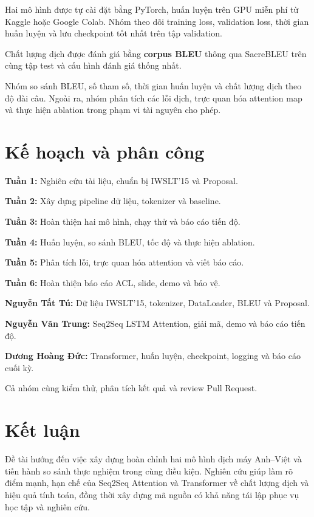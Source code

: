 \documentclass[11pt,a4paper]{article}
\begin{document}
Hai mô hình được tự cài đặt bằng PyTorch,
huấn luyện trên GPU miễn phí từ Kaggle
hoặc Google Colab. Nhóm theo dõi
training loss, validation loss, thời gian
huấn luyện và lưu checkpoint tốt nhất
trên tập validation.

Chất lượng dịch được đánh giá bằng
\textbf{corpus BLEU}
\citep{papineni2002bleu} thông qua
SacreBLEU trên cùng tập test và cấu hình
đánh giá thống nhất.

Nhóm so sánh BLEU, số tham số, thời gian
huấn luyện và chất lượng dịch theo độ dài
câu. Ngoài ra, nhóm phân tích các lỗi dịch,
trực quan hóa attention map và thực hiện
ablation trong phạm vi tài nguyên cho phép.


\section{Kế hoạch và phân công}

\textbf{Tuần 1:} Nghiên cứu tài liệu,
chuẩn bị IWSLT'15 và Proposal.

\textbf{Tuần 2:} Xây dựng pipeline dữ liệu,
tokenizer và baseline.

\textbf{Tuần 3:} Hoàn thiện hai mô hình,
chạy thử và báo cáo tiến độ.

\textbf{Tuần 4:} Huấn luyện, so sánh BLEU,
tốc độ và thực hiện ablation.

\textbf{Tuần 5:} Phân tích lỗi, trực quan hóa
attention và viết báo cáo.

\textbf{Tuần 6:} Hoàn thiện báo cáo ACL,
slide, demo và bảo vệ.

\textbf{Nguyễn Tất Tú:} Dữ liệu IWSLT'15,
tokenizer, DataLoader, BLEU và Proposal.

\textbf{Nguyễn Văn Trung:} Seq2Seq LSTM 
Attention, giải mã, demo và báo cáo tiến độ.

\textbf{Dương Hoàng Đức:} Transformer, huấn 
luyện, checkpoint, logging và báo cáo cuối kỳ.

Cả nhóm cùng kiểm thử, phân tích kết quả
và review Pull Request.

\section{Kết luận}

Đề tài hướng đến việc xây dựng hoàn chỉnh
hai mô hình dịch máy Anh--Việt và tiến hành
so sánh thực nghiệm trong cùng điều kiện.
Nghiên cứu giúp làm rõ điểm mạnh, hạn chế
của Seq2Seq Attention và Transformer
về chất lượng dịch và hiệu quả tính toán,
đồng thời xây dựng mã nguồn có khả năng
tái lập phục vụ học tập và nghiên cứu.


\end{document}
